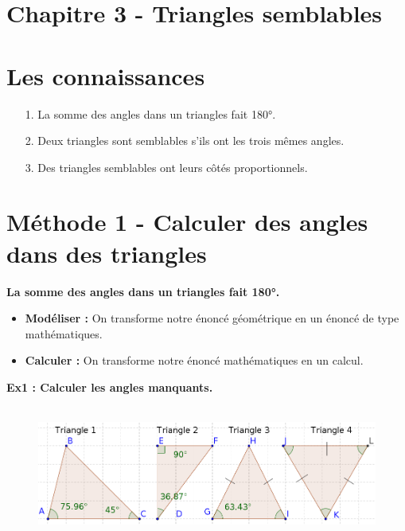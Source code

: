 




\setlength{\columnseprule}{1pt}

\horrule{2px}
\section*{Chapitre 3 - Triangles semblables}
\horrule{2px}

\section*{Les connaissances}

\begin{enumerate}
  \item[1.] La somme des angles dans un triangles fait 180°.
  \item[2.] Deux triangles sont semblables s'ils ont les trois mêmes angles.
  \item[3.] Des triangles semblables ont leurs côtés proportionnels. 
\end{enumerate}

\section*{Méthode 1 - Calculer des angles dans des triangles}

\textbf{La somme des angles dans un triangles fait 180°.} 

\begin{itemize}
  \item \textbf{Modéliser : } On transforme notre énoncé géométrique en un énoncé de type mathématiques.
  \item \textbf{Calculer : } On transforme notre énoncé mathématiques en un calcul. 
\end{itemize}

\horrule{1px}
\textbf{Ex1 : Calculer les angles manquants.}

\begin{figure}[H]
      \centering
      \includegraphics[width=0.7\linewidth]{4x3-triangles-semblables/m1-calculer-angles-triangles.png}
\end{figure}


